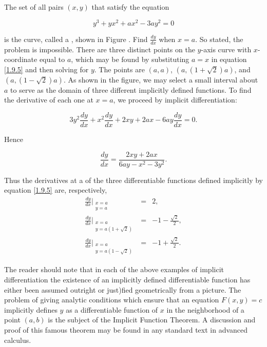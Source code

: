 \begin{example} 
The set of all pairs $(x, y)$ that satisfy the equation

\begin{equation}
y^3 + yx^2 + ax^2 -3ay^2 = 0 
\label{eq1.9.5}
\end{equation}

is the curve, called a , shown in Figure .
Find $\frac{dy}{dx}$ when $x = a$. So stated, the problem is impossible. There are three distinct points on the $y$-axis curve with $x$-coordinate equal to $a$, which may be found by substituting $a = x$ in equation \eqref{1.9.5} and then solving for $y$. The points are $(a, a)$, $(a, (1 + \sqrt2)a)$, and $(a, (1 - \sqrt2)a)$.  As shown in the figure, we may select a small interval about $a$ to serve as the domain of three different implicitly defined functions. To find the derivative of each one at $x = a$, we proceed by implicit differentiation:


$$
3y^2 \frac{dy}{dx} + x^2 \frac{dy}{dx} + 2xy + 2ax - 6ay \frac{dy}{dx} = 0.
$$

Hence 

$$
\frac{dy}{dx} = \frac{2xy + 2ax}{6ay-x^2 - 3y^2}.
$$

Thus the derivatives at a of the three differentiable functions defined implicitly by equation \eqref{1.9.5} are, respectively,
\begin{eqnarray*}
\frac{dy}{dx} \Big|_{\begin{array}{l}
                  x=a \\ y=a
                 \end{array}
                } &=& 2,\\
\frac{dy}{dx} \Big|_{\begin{array}{l}
                  x=a \\ y=a(1+\sqrt2)
                 \end{array} 
                } &=& -1 - \frac{\sqrt2}{2},\\
\frac{dy}{dx} \Big|_{\begin{array}{l}
                  x=a \\ y=a(1-\sqrt2)
                 \end{array} 
                } &=& -1 + \frac{\sqrt2}{2}.
\end{eqnarray*}

The reader should note that in each of the above examples of implicit differentiation the existence of an implicitly defined differentiable function has either been assumed outright or just)fied geometrically from a picture. The problem of giving analytic conditions which ensure that an equation $F(x, y) = c$ implicitly defines $y$ as a differentiable function of $x$ in the neighborhood of a point $(a, b)$ is the subject of the Implicit Function Theorem. A discussion and proof of this famous theorem may be found in any standard text in advanced calculus.
\end{example}


